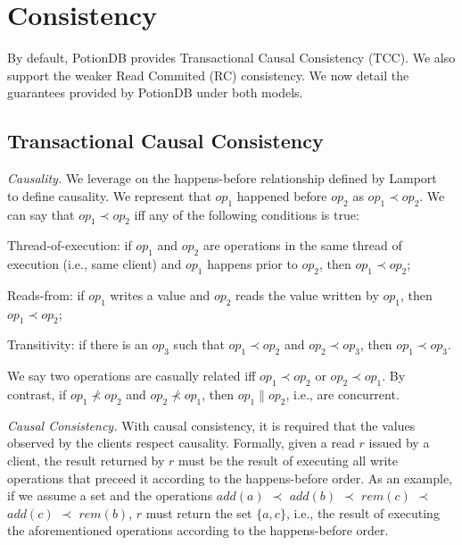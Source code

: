 \documentclass{vldb}
\begin{document}
\section{{Consistency}}
\label{sec:consistency}

By default, PotionDB provides Transactional Causal Consistency (TCC).
We also support the weaker Read Commited (RC) consistency. %
We now detail the guarantees provided by PotionDB under both models.

\subsection{Transactional Causal Consistency}
\label{subsec:transactionalcausal}

\emph{Causality.} 
We leverage on the happens-before relationship defined by Lamport~\cite{lamport78} to define causality.
We represent that $op_1$ happened before $op_2$ as $op_1 \prec op_2$.
We can say that $op_1 \prec op_2$ iff any of the following conditions is true:

\begin{compactitem}
	\item Thread-of-execution: if $op_1$ and $op_2$ are operations in the same thread of execution (i.e., same client) and $op_1$ happens prior to $op_2$, then $op_1 \prec op_2$;
	\item Reads-from: if $op_1$ writes a value and $op_2$ reads the value written by $op_1$, then $op_1 \prec op_2$;
	\item Transitivity: if there is an $op_3$ such that $op_1 \prec op_2$ and $op_2 \prec op_3$, then $op_1 \prec op_3$.
\end{compactitem} 

We say two operations are casually related iff $op_1 \prec op_2$ or $op_2 \prec op_1$.
By contrast, if $op_1 \nprec op_2$ and $op_2 \nprec op_1$, then $op_1 \parallel op_2$, i.e., are concurrent.

\emph{Causal Consistency.}
With causal consistency, it is required that the values observed by the clients respect causality.
Formally, given a read $r$ issued by a client, the result returned by $r$ must be the result of executing all write operations that preceed it according to the happens-before order.
As an example, if we assume a set and the operations $add(a)$ $\prec$ $add(b)$ $\prec$ $rem(c)$ $\prec$ $add(c)$ $\prec$ $rem(b)$, $r$ must return the set $\{a, c\}$, i.e., the result of executing the aforementioned operations according to the happens-before order.
\end{document}
